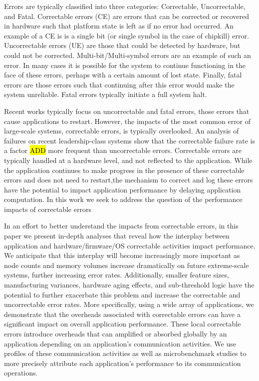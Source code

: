 Errors are typically classified into three categories: Correctable,
Uncorrectable, and Fatal. Correctable errors (CE) are errors that can be
corrected or recovered in hardware such that platform state is left as if no
error had occurred.  An example of a CE is is a single bit (or single symbol in
the case of chipkill) error.  Uncorrectable errors (UE) are those that could be
detected by hardware, but could not be corrected.  Multi-bit/Multi-symbol errors
are an example of such an error.  In many cases it is possible for the system to
continue functioning in the face of these errors, perhaps with a certain amount
of lost state.  Finally, fatal errors are those errors such that continuing
after this error would make the system unreliable.  Fatal errors typically
initiate a full system halt.

Recent works typically focus on uncorrectable and fatal errors, those errors that cause
applications to restart.  However, the impacts of the most common error of
large-scale systems, correctable errors, is typically overlooked. An analysis of
failures on recent leadership-class systems show that the correctable failure
rate is a factor \hl{ADD} more frequent than uncorrectable errors.  Correctable
errors are typically handled at a hardware level, and not reflected to the
application.  While the application continues to make progress in the presence
of these correctable errors and does not need to restart,the mechanism to
correct and log these errors have the potential to impact application
performance by delaying application computation. In this work we seek to address
the question of the performance impacts of correctable errors


\label{fig:propagation}

In an effort to better understand the impacts from correctable errors, in this
paper we present in-depth analyses that reveal how the interplay between
application and hardware/firmware/OS correctable activities impact performance.
We anticipate that this interplay will become increasingly more important as
node counts and memory volumes increase dramatically on future extreme-scale
systems, further increasing error rates.  Additionally, smaller feature sizes,
manufacturing variances, hardware aging effects, and sub-threshold logic have
the potential to further exacerbate this problem and increase the correctable
and uncorrectable error rates.  More specifically, using a wide array of
applications, we demonstrate that the overheads associated with  correctable
errors can have a significant impact on overall application performance.  These
local correctable errors introduce overheads that can amplified or absorbed
globally by an application depending on an application's communication
activities.  We use profiles of these communication activities as well as
microbenchmark studies to more precisely attribute each application's
performance to its communication operations.

